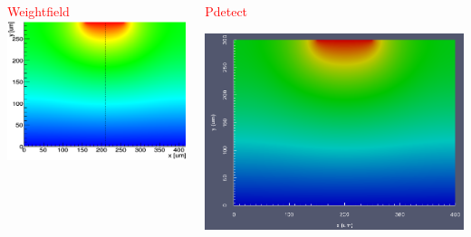 \documentclass[14pt]{beamer}
\begin{document}
\begin{frame}
\begin{columns}
      \begin{column}{0.43\textwidth}

        \begin{center}
          \textcolor{red}{Weightfield}
          \includegraphics[width=\textwidth]{images/weight_free.png}
        \end{center}
      \end{column}

      \begin{column}{0.47\textwidth}
        \begin{center}
          \vspace{0.5em}

          \textcolor{red}{Pdetect}

            \vspace{0.3em}

          \includegraphics[width=\textwidth]{images/w_free_conditions.png}
        \end{center}


\end{column}
\end{columns}
\end{frame}
\end{document}
